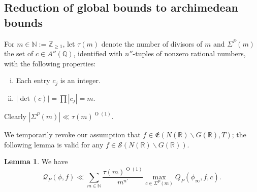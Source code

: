\documentclass[reqno]{amsart}
\def\O{\operatorname{O}}
\theoremstyle{plain} \newtheorem{theorem} {Theorem}
\theoremstyle{definition} \newtheorem{definition} [theorem] {Definition}
\theoremstyle{itplain} %
\newtheorem{lemma}[theorem]{Lemma}
\numberwithin{equation}{section}
\numberwithin{theorem}{section}
\renewcommand{\geq}{\geqslant}
\begin{document}
\subsection{Reduction of global bounds to archimedean bounds}
For $m \in \mathbb{N} := \mathbb{Z}_{\geq 1}$, let $\tau(m)$ denote the number of divisors of $m$ and $\Sigma^P(m)$ the set of $c \in A''(\mathbb{Q})$, identified with $n''$-tuples of nonzero rational numbers, with the following properties:
\begin{enumerate}[(i)]
\item Each entry $c_j$ is an integer.
\item $|\det(c)| = \prod |c_j| = m$.
\end{enumerate}
Clearly $|\Sigma^P(m)| \ll \tau(m)^{\O(1)}$.

We temporarily revoke our assumption that $f \in \mathfrak{E}(N(\mathbb{R}) \backslash G(\mathbb{R}), T)$; the following lemma is valid for any $f \in \mathcal{S}(N(\mathbb{R}) \backslash G(\mathbb{R}))$.
\begin{lemma}\label{lem:scratch-research:we-have-begin}
  We have
  \begin{equation}\label{eq:mathc-f_infty-ll}
    \mathcal{Q}_P(\phi,f) \ll \sum _{m \in \mathbb{N}}
    \frac{\tau(m)^{\O(1)}}{m^{n'}}
    \max_{c \in \Sigma^P(m)}
    Q_P(\phi_\infty, f, c).
  \end{equation}
\end{lemma}
\end{document}
